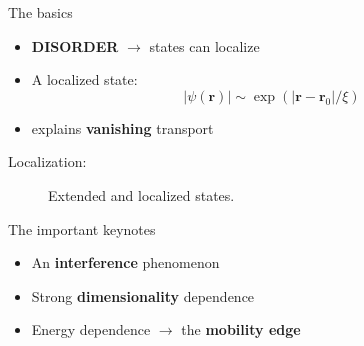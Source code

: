 \documentclass[1pt]{beamer}
\begin{document}
\begin{frame}{The basics}
\begin{minipage}[c]{0.5\textwidth}
\begin{itemize}
\item \textbf{DISORDER} $\rightarrow$ states can localize
\vspace{10mm}
\item A localized state:
$$|\psi(\mathbf{r})| \sim \exp\left(|\mathbf{r} - \mathbf{r}_0 |/\xi \right)$$
\vspace{5mm}
\item explains \textbf{vanishing} transport
\vspace{10mm}
\end{itemize}
\end{minipage}
\begin{minipage}[c]{0.4\textwidth}
\centering
Localization:
\begin{figure}
\caption{Extended and localized states.}
\end{figure}
\end{minipage}
\end{frame}

\begin{frame}{The important keynotes}
\begin{minipage}[c]{0.5\textwidth}
\begin{itemize}
\item An \textbf{interference} phenomenon
\vspace{8mm}		
\item Strong \textbf{dimensionality} dependence
\vspace{8mm}
\item Energy dependence $\rightarrow$ the \textbf{mobility edge}

\end{itemize}
\end{minipage}
\end{frame}
\end{document}
